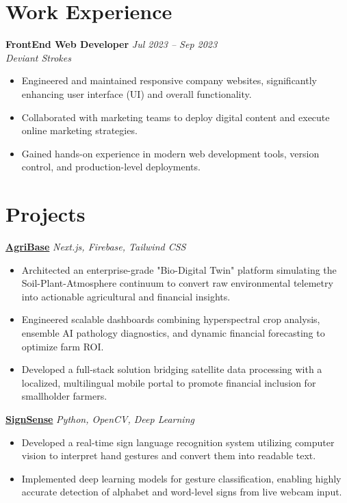 \documentclass[a4paper,10pt]{article}
\begin{document}
\section*{Work Experience}
\noindent \textbf{FrontEnd Web Developer} \hfill \textit{Jul 2023 -- Sep 2023} \\
\textit{Deviant Strokes}
\begin{itemize}
    \item Engineered and maintained responsive company websites, significantly enhancing user interface (UI) and overall functionality.
    \item Collaborated with marketing teams to deploy digital content and execute online marketing strategies.
    \item Gained hands-on experience in modern web development tools, version control, and production-level deployments.
\end{itemize}

\section*{Projects}

\noindent \href{https://github.com/awk-way/gdg}{\large\textbf{AgriBase}} \hfill \textit{Next.js, Firebase, Tailwind CSS}
\begin{itemize}
    \item Architected an enterprise-grade "Bio-Digital Twin" platform simulating the Soil-Plant-Atmosphere continuum to convert raw environmental telemetry into actionable agricultural and financial insights.
    \item Engineered scalable dashboards combining hyperspectral crop analysis, ensemble AI pathology diagnostics, and dynamic financial forecasting to optimize farm ROI.
    \item Developed a full-stack solution bridging satellite data processing with a localized, multilingual mobile portal to promote financial inclusion for smallholder farmers.
\end{itemize}

\vspace{1ex}

\noindent \href{https://github.com/awk-way/learning}{\large\textbf{SignSense}} \hfill \textit{Python, OpenCV, Deep Learning}
\begin{itemize}
    \item Developed a real-time sign language recognition system utilizing computer vision to interpret hand gestures and convert them into readable text.
    \item Implemented deep learning models for gesture classification, enabling highly accurate detection of alphabet and word-level signs from live webcam input.
\end{itemize}
\end{document}
